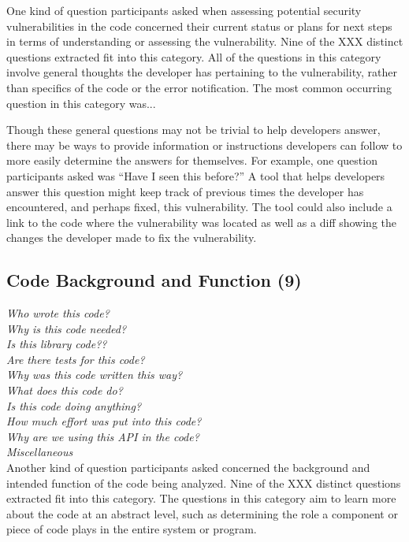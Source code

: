 \documentclass[conference]{IEEEtran}
\begin{document}
One kind of question participants asked when assessing potential security vulnerabilities in the code concerned their current status or plans for next steps in terms of understanding or assessing the vulnerability. Nine of the XXX distinct questions extracted fit into this category. All of the questions in this category involve general thoughts the developer has pertaining to the vulnerability, rather than specifics of the code or the error notification.  The most common occurring question in this category was...

Though these general questions may not be trivial to help developers answer, there may be ways to provide information or instructions developers can follow to more easily determine the answers for themselves. For example, one question participants asked was ``Have I seen this before?'' A tool that helps developers answer this question might keep track of previous times the developer has encountered, and perhaps fixed, this vulnerability. The tool could also include a link to the code where the vulnerability was located as well as a diff showing the changes the developer made to fix the vulnerability.


\noindent\subsection{\textbf{Code Background and Function (9)}}

\noindent\emph{Who wrote this code?} \\
\emph{Why is this code needed?} \\
\emph{Is this library code??} \\
\emph{Are there tests for this code?} \\
\emph{Why was this code written this way?} \\
\emph{What does this code do?} \\
\emph{Is this code doing anything?} \\
\emph{How much effort was put into this code?} \\
\emph{Why are we using this API in the code?} \\
\emph{Miscellaneous} \\

Another kind of question participants asked concerned the background and intended function of the code being analyzed. Nine of the XXX distinct questions extracted fit into this category. The questions in this category aim to learn more about the code at an abstract level, such as determining the role a component or piece of code plays in the entire system or program.
\end{document}
